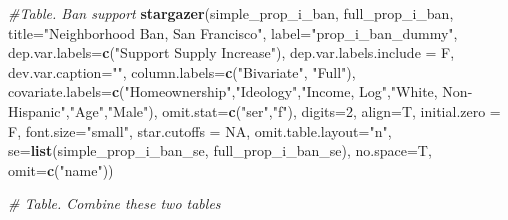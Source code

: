 \documentclass[]{article}
\newenvironment{Shaded}{\begin{snugshade}}{\end{snugshade}}
\newcommand{\CommentTok}[1]{\textcolor[rgb]{0.56,0.35,0.01}{\textit{#1}}}
\newcommand{\DataTypeTok}[1]{\textcolor[rgb]{0.13,0.29,0.53}{#1}}
\newcommand{\DecValTok}[1]{\textcolor[rgb]{0.00,0.00,0.81}{#1}}
\newcommand{\KeywordTok}[1]{\textcolor[rgb]{0.13,0.29,0.53}{\textbf{#1}}}
\newcommand{\NormalTok}[1]{#1}
\newcommand{\OtherTok}[1]{\textcolor[rgb]{0.56,0.35,0.01}{#1}}
\newcommand{\StringTok}[1]{\textcolor[rgb]{0.31,0.60,0.02}{#1}}
\begin{document}
\begin{Shaded}
\begin{Highlighting}[]
\CommentTok{#Table. Ban support}
\KeywordTok{stargazer}\NormalTok{(simple_prop_i_ban, full_prop_i_ban, }\DataTypeTok{title=}\StringTok{"Neighborhood Ban, San Francisco"}\NormalTok{,  }\DataTypeTok{label=}\StringTok{"prop_i_ban_dummy"}\NormalTok{,}
          \DataTypeTok{dep.var.labels=}\KeywordTok{c}\NormalTok{(}\StringTok{"Support Supply Increase"}\NormalTok{), }\DataTypeTok{dep.var.labels.include =}\NormalTok{ F, }\DataTypeTok{dev.var.caption=}\StringTok{""}\NormalTok{,}
          \DataTypeTok{column.labels=}\KeywordTok{c}\NormalTok{(}\StringTok{"Bivariate"}\NormalTok{, }\StringTok{"Full"}\NormalTok{),}
          \DataTypeTok{covariate.labels=}\KeywordTok{c}\NormalTok{(}\StringTok{"Homeownership"}\NormalTok{,}\StringTok{"Ideology"}\NormalTok{,}\StringTok{"Income, Log"}\NormalTok{,}\StringTok{"White, Non-Hispanic"}\NormalTok{,}\StringTok{"Age"}\NormalTok{,}\StringTok{"Male"}\NormalTok{),}
          \DataTypeTok{omit.stat=}\KeywordTok{c}\NormalTok{(}\StringTok{"ser"}\NormalTok{,}\StringTok{"f"}\NormalTok{), }\DataTypeTok{digits=}\DecValTok{2}\NormalTok{, }\DataTypeTok{align=}\NormalTok{T,}
          \DataTypeTok{initial.zero =}\NormalTok{ F, }\DataTypeTok{font.size=}\StringTok{"small"}\NormalTok{, }\DataTypeTok{star.cutoffs =} \OtherTok{NA}\NormalTok{, }\DataTypeTok{omit.table.layout=}\StringTok{"n"}\NormalTok{,}
          \DataTypeTok{se=}\KeywordTok{list}\NormalTok{(simple_prop_i_ban_se, full_prop_i_ban_se), }\DataTypeTok{no.space=}\NormalTok{T, }\DataTypeTok{omit=}\KeywordTok{c}\NormalTok{(}\StringTok{"name"}\NormalTok{))}

\CommentTok{# Table. Combine these two tables}


\end{Highlighting}
\end{Shaded}
\end{document}
